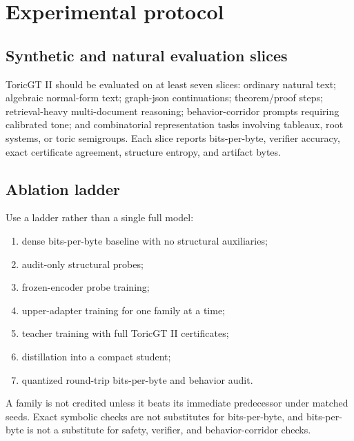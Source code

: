 \documentclass[10pt]{article}
\numberwithin{equation}{section}
\begin{document}
\clearpage
\section{Experimental protocol}
\subsection{Synthetic and natural evaluation slices}
ToricGT II should be evaluated on at least seven slices: ordinary natural text; algebraic normal-form text; graph-json continuations; theorem/proof steps; retrieval-heavy multi-document reasoning; behavior-corridor prompts requiring calibrated tone; and combinatorial representation tasks involving tableaux, root systems, or toric semigroups. Each slice reports bits-per-byte, verifier accuracy, exact certificate agreement, structure entropy, and artifact bytes.

\subsection{Ablation ladder}
Use a ladder rather than a single full model:
\begin{enumerate}
\item dense bits-per-byte baseline with no structural auxiliaries;
\item audit-only structural probes;
\item frozen-encoder probe training;
\item upper-adapter training for one family at a time;
\item teacher training with full ToricGT II certificates;
\item distillation into a compact student;
\item quantized round-trip bits-per-byte and behavior audit.
\end{enumerate}
A family is not credited unless it beats its immediate predecessor under matched seeds. Exact symbolic checks are not substitutes for bits-per-byte, and bits-per-byte is not a substitute for safety, verifier, and behavior-corridor checks.
\end{document}
